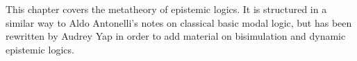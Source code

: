 \documentclass[../../../include/open-logic-chapter]{subfiles}
\begin{document}

\begin{editorial}
  This chapter covers the metatheory of epistemic logics. It is structured in a similar way to Aldo Antonelli's notes on classical  basic modal logic, but has been rewritten by Audrey Yap in order to add material on bisimulation and dynamic epistemic logics.
\end{editorial}



\OLEndPartHook
\end{document}
